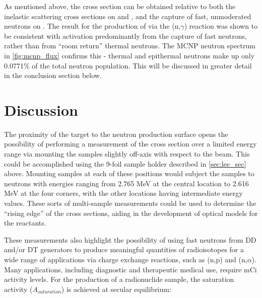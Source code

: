 \documentclass[5p]{elsarticle}
\newcommand{\comment}[1]{\todo[color=blue!20!white,inline]{ASV: #1}}
\begin{document}
As mentioned above, the cross section can be obtained relative to both the inelastic scattering cross sections on  and , and the capture of fast, unmoderated neutrons on .
The result for the production of  via the (n,$\gamma$) reaction was shown to be consistent with activation predominantly from the capture of fast neutrons, rather than from \enquote{room return} thermal neutrons.
The MCNP neutron spectrum in   \autoref{fig:mcnp_flux} confirms this - thermal and epithermal neutrons make up only 0.0771\% of the total neutron population.
 This will be discussed in greater detail in the conclusion section below.




 




          
\section{Discussion}




The proximity of the target to the neutron production surface opens the possibility of performing a measurement of the cross section over a limited energy range via mounting the samples slightly off-axis with respect to the beam.
 This could be accomplished using the 9-foil sample holder described in \autoref{sec:lee_sec} above.
 Mounting samples at each of these positions would subject the samples to neutrons with energies ranging from 2.765 MeV at the central location to 2.616 MeV at the four corners, with the other locations having intermediate energy values.
 These sorts of multi-sample measurements could be used to determine the \enquote{rising edge} of the cross sections, aiding in the development of optical models for the reactants.



These measurements also highlight the possibility of using fast neutrons from DD and/or DT generators to produce meaningful quantities of radioisotopes for a wide range of applications via charge exchange reactions, such as (n,p) and (n,$\alpha$).
 Many applications, including diagnostic and therapeutic medical use, require mCi activity levels.
 For the production of a radionuclide sample, the saturation activity ($A_{saturation}$) is achieved at secular equilibrium:
\end{document}
